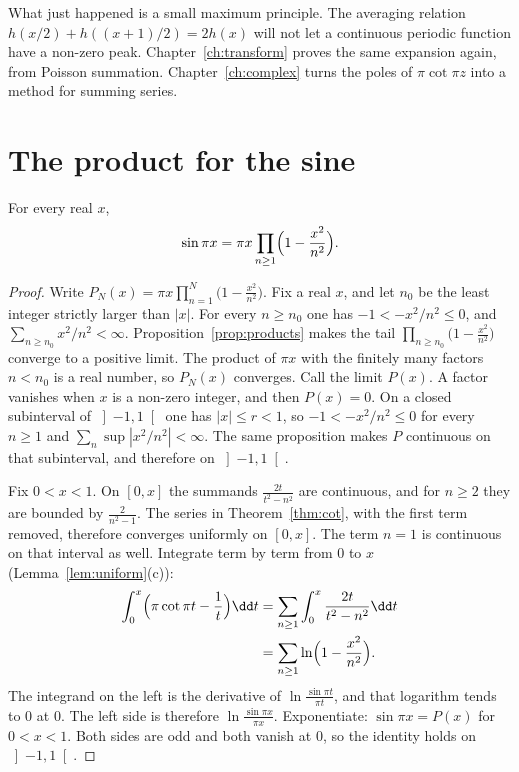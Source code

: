 What just happened is a small maximum principle. The averaging relation $h(x/2)+h((x+1)/2)=2h(x)$ will not let a continuous periodic function have a non-zero peak. Chapter~\ref{ch:transform} proves the same expansion again, from Poisson summation. Chapter~\ref{ch:complex} turns the poles of $\pi\cot\pi z$ into a method for summing series.

\section{The product for the sine}

\begin{theorem}[Euler]\label{thm:sineproduct}
For every real $x$,
\[
\sin\pi x=\pi x\prod_{n\ge1}\Bigl(1-\frac{x^2}{n^2}\Bigr).
\]
\end{theorem}
\begin{proof}
Write $P_N(x)=\pi x\prod_{n=1}^N\bigl(1-\frac{x^2}{n^2}\bigr)$. Fix a real $x$, and let $n_0$ be the least integer strictly larger than $|x|$. For every $n\ge n_0$ one has $-1<-x^2/n^2\le0$, and $\sum_{n\ge n_0}x^2/n^2<\infty$. Proposition~\ref{prop:products} makes the tail $\prod_{n\ge n_0}\bigl(1-\frac{x^2}{n^2}\bigr)$ converge to a positive limit. The product of $\pi x$ with the finitely many factors $n<n_0$ is a real number, so $P_N(x)$ converges. Call the limit $P(x)$. A factor vanishes when $x$ is a non-zero integer, and then $P(x)=0$. On a closed subinterval of $\left]-1,1\right[$ one has $|x|\le r<1$, so $-1<-x^2/n^2\le0$ for every $n\ge1$ and $\sum_n\sup|x^2/n^2|<\infty$. The same proposition makes $P$ continuous on that subinterval, and therefore on $\left]-1,1\right[$.

Fix $0<x<1$. On $[0,x]$ the summands $\frac{2t}{t^2-n^2}$ are continuous, and for $n\ge2$ they are bounded by $\frac2{n^2-1}$. The series in Theorem~\ref{thm:cot}, with the first term removed, therefore converges uniformly on $[0,x]$. The term $n=1$ is continuous on that interval as well. Integrate term by term from $0$ to $x$ (Lemma~\ref{lem:uniform}(c)):
\[
\begin{aligned}\int_0^x\Bigl(\pi\cot\pi t-\frac1t\Bigr)\dd t&=\sum_{n\ge1}\int_0^x\frac{2t}{t^2-n^2}\dd t\\&=\sum_{n\ge1}\ln\Bigl(1-\frac{x^2}{n^2}\Bigr).\end{aligned}
\]
The integrand on the left is the derivative of $\ln\frac{\sin\pi t}{\pi t}$, and that logarithm tends to $0$ at $0$. The left side is therefore $\ln\frac{\sin\pi x}{\pi x}$. Exponentiate: $\sin\pi x=P(x)$ for $0<x<1$. Both sides are odd and both vanish at $0$, so the identity holds on $\left]-1,1\right[$.


\end{proof}
